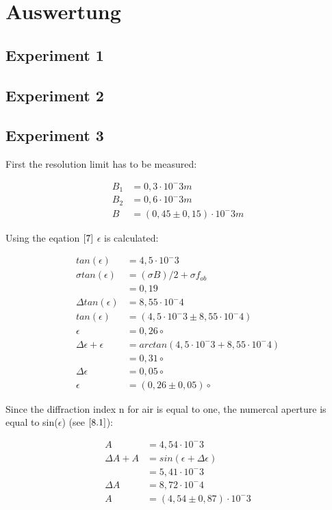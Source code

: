 \section{Auswertung}

\subsection{Experiment 1}

\subsection{Experiment 2}

\subsection{Experiment 3}

First the resolution limit has to be measured:

\begin{align*}
    B_{1} & = 0,3 \cdot 10^-3 m \\
    B_{2} & = 0,6 \cdot 10^-3 m \\
    B &= (0,45 \pm 0,15) \cdot 10^-3 m
\end{align*}

Using the eqation $\ref{7}$ $\epsilon$ is calculated:

\begin{align*}
    tan(\epsilon) & = 4,5 \cdot 10^-3 \\
    \sigma tan(\epsilon) &= (\sigma B)/2 + \sigma f_{ob} \\
    &= 0,19 \\
    \Delta tan(\epsilon) &= 8,55 \cdot 10^-4  \\
    tan(\epsilon) & = (4,5 \cdot 10^-3 \pm 8,55 \cdot 10^-4) \\
    \epsilon &= 0,26 \circ \\
    \Delta \epsilon + \epsilon &= arctan(4,5 \cdot 10^-3 + 8,55 \cdot 10^-4) \\
    &= 0,31 \circ \\
    \Delta \epsilon &= 0,05 \circ \\
    \epsilon &= (0,26 \pm 0,05) \circ
\end{align*}

Since the diffraction index n for air is equal to one, the numercal aperture is equal to sin($\epsilon$) (see $\ref{8.1}$):

\begin{align*}
  A & = 4,54 \cdot 10^-3 \\
  \Delta A + A & = sin(\epsilon + \Delta \epsilon) \\
  &= 5,41 \cdot 10^-3 \\
  \Delta A &= 8,72 \cdot 10^-4 \\
  A & = (4,54 \pm 0,87 ) \cdot 10^-3
\end{align*}

